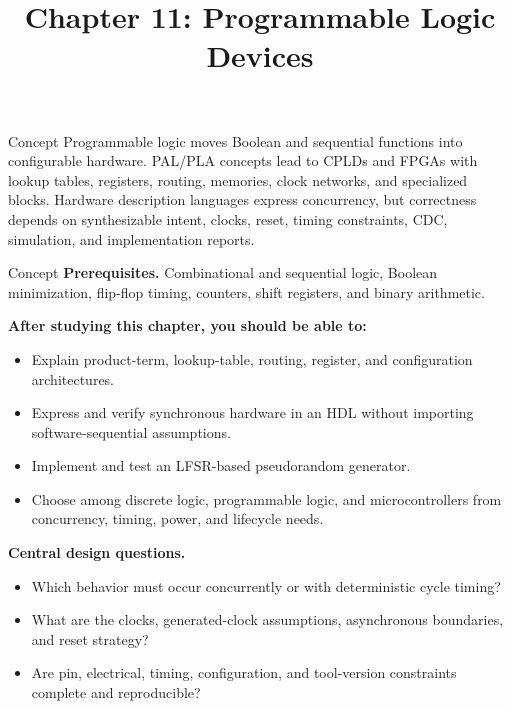 \documentclass[10pt,letterpaper]{article}
\title{Chapter 11: Programmable Logic Devices}
\author{}
\date{}
\begin{document}
\maketitle

\begin{CornellOverviewBox}{Concept}
Programmable logic moves Boolean and sequential functions into configurable hardware. PAL/PLA concepts lead to CPLDs and FPGAs with lookup tables, registers, routing, memories, clock networks, and specialized blocks. Hardware description languages express concurrency, but correctness depends on synthesizable intent, clocks, reset, timing constraints, CDC, simulation, and implementation reports.
\end{CornellOverviewBox}
\begin{CornellOverviewBox}{Concept}
\textbf{Prerequisites.} Combinational and sequential logic, Boolean minimization, flip-flop timing, counters, shift registers, and binary arithmetic.

\textbf{After studying this chapter, you should be able to:}
\begin{itemize}
  \item Explain product-term, lookup-table, routing, register, and configuration architectures.
  \item Express and verify synchronous hardware in an HDL without importing software-sequential assumptions.
  \item Implement and test an LFSR-based pseudorandom generator.
  \item Choose among discrete logic, programmable logic, and microcontrollers from concurrency, timing, power, and lifecycle needs.
\end{itemize}\textbf{Central design questions.}
\begin{itemize}
  \item Which behavior must occur concurrently or with deterministic cycle timing?
  \item What are the clocks, generated-clock assumptions, asynchronous boundaries, and reset strategy?
  \item Are pin, electrical, timing, configuration, and tool-version constraints complete and reproducible?
\end{itemize}\end{CornellOverviewBox}
\end{document}
